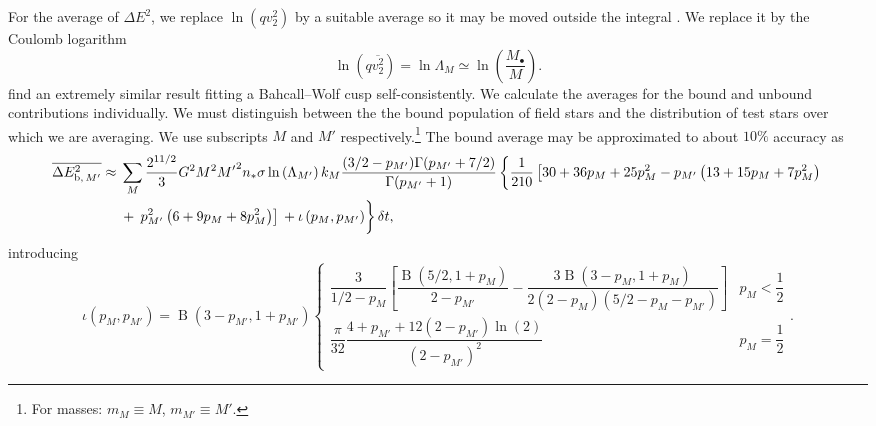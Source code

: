 \documentclass[useAMS,usedcolumn,usegraphicx,usenatbib]{mn2e}
\DeclareMathOperator{\Beta}{B}
\newcommand{\recip}[1]{\ensuremath{\dfrac{1}{#1}}}
\begin{document}
\begin{onecolumn}
For the average of $\Delta E^2$, we replace $\ln\left(qv_2^2\right)$ by a suitable average so it may be moved outside the integral \citep[chapter 2]{Chandrasekhar1960}. We replace it by the Coulomb logarithm \citep{Bahcall1976}
\begin{equation}
\ln\left(q\overline{v_2^2}\right) = \ln \Lambda_M \simeq \ln\left(\frac{M_\bullet}{M}\right).
\end{equation}
\citet{Just2011} find an extremely similar result fitting a Bahcall--Wolf cusp self-consistently. We calculate the averages for the bound and unbound contributions individually. We must distinguish between the the bound population of field stars and the distribution of test stars over which we are averaging. We use subscripts $M$ and $M'$ respectively.\footnote{For masses: $m_M \equiv M$, $m_{M'} \equiv M'$.} The bound average may be approximated to about $10\%$ accuracy as
\begin{align}
\overline{\Delta E^2_{\mathrm{b},\,M'}} \approx {} & \sum_M\frac{2^{11/2}}{3}G^2M^2{M'}^2n_\ast\sigma\ln\left(\Lambda_{M'}\right) k_M \frac{(3/2 - p_{M'})\Gamma(p_{M'} + 7/2)}{\Gamma(p_{M'} + 1)} \left\{ \recip{210}\left[30 + 36p_M + 25p_M^2 - p_{M'}\left(13 + 15p_M + 7 p_M^2\right) \right. \right. \nonumber \\* 
 {} & + \left. \left. p_{M'}^2\left(6 + 9p_M + 8p_M^2\right)\right]  \vphantom{\recip{210}} + \iota \left(p_M,p_{M'}\right) \right\} \delta t,
\end{align}
introducing
\begin{equation}
\iota\left(p_M,p_{M'}\right) = \Beta\left(3-p_{M'},1+p_{M'}\right) \begin{cases} \dfrac{3}{1/2 - p_M}\left[\dfrac{\Beta\left(5/2,1+p_M\right)}{2-p_{M'}} - \dfrac{3\Beta\left(3-p_M,1+p_M\right)}{2\left(2-p_M\right)\left(5/2 - p_M - p_{M'}\right)}\right] & p_M < \recip{2} \\
\dfrac{\pi}{32}\dfrac{4 + p_{M'} + 12 \left(2 - p_{M'}\right) \ln(2)}{\left(2-p_{M'}\right)^2} & p_M = \recip{2} \end{cases}.
\end{equation}


\end{onecolumn}
\end{document}
